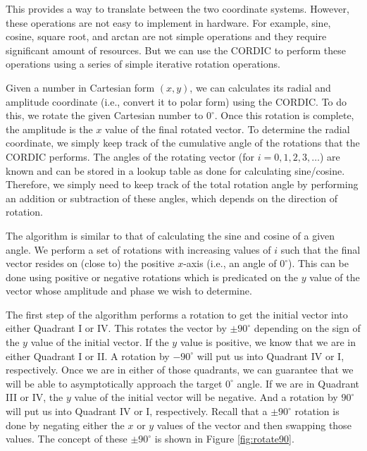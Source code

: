 This provides a way to translate between the two coordinate systems. However, these operations are not easy to implement in hardware. For example, sine, cosine, square root, and arctan are not simple operations and they require significant amount of resources. But we can use the CORDIC to perform these operations using a series of simple iterative rotation operations. 

Given a number in Cartesian form $(x,y)$, we can calculates its radial and amplitude coordinate (i.e., convert it to polar form) using the CORDIC. To do this, we rotate the given Cartesian number to $0^{\circ}$. Once this rotation is complete, the amplitude is the $x$ value of the final rotated vector. To determine the radial coordinate, we simply keep track of the cumulative angle of the rotations that the CORDIC performs. The angles of the rotating vector (for $i = 0,1,2,3, \dots$) are known and can be stored in a lookup table as done for calculating sine/cosine. Therefore, we simply need to keep track of the total rotation angle by performing an addition or subtraction of these angles, which depends on the direction of rotation.

The algorithm is similar to that of calculating the sine and cosine of a given angle. We perform a set of rotations with increasing values of $i$ such that the final vector resides on (close to) the positive $x$-axis (i.e., an angle of $0^{\circ}$). This can be done using positive or negative rotations  which is predicated on the $y$ value of the vector whose amplitude and phase we wish to determine. 

The first step of the algorithm performs a rotation to get the initial vector into either Quadrant I or IV. This rotates the vector by $\pm 90^{\circ}$ depending on the sign of the $y$ value of the initial vector. If the $y$ value is positive, we know that we are in either Quadrant I or II. A rotation by $-90^{\circ}$ will put us into Quadrant IV or I, respectively. Once we are in either of those quadrants, we can guarantee that we will be able to asymptotically approach the target $0^{\circ}$ angle. If we are in Quadrant III or IV, the $y$ value of the initial vector will be negative. And a rotation by $90^{\circ}$ will put us into Quadrant IV or I, respectively. Recall that a $\pm 90^{\circ}$ rotation is done by negating either the $x$ or $y$ values of the vector and then swapping those values. The concept of these $\pm 90^{\circ}$ is shown in Figure \ref{fig:rotate90}.

